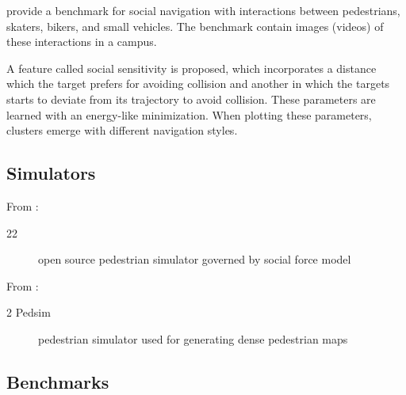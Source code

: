 
\cite{robicquet2016learning} provide a benchmark for social navigation with interactions between pedestrians, skaters, bikers, and small vehicles. 
%
The benchmark contain images (videos) of these interactions in a campus.

A feature called social sensitivity is proposed, which incorporates a distance which the target prefers for avoiding collision and another in which the targets starts to deviate from its trajectory to avoid collision.
%
These parameters are learned with an energy-like minimization.
%
When plotting these parameters, clusters emerge with different navigation styles.

\subsection{Simulators}

From \cite{okal2016learning}:
\begin{description}
	\item[22 ] open source pedestrian simulator governed by social force model
\end{description}

From \cite{kiss2021probabilistic}:
\begin{description}
	\item[2 Pedsim] pedestrian simulator used for generating dense pedestrian maps
\end{description}

\subsection{Benchmarks}

